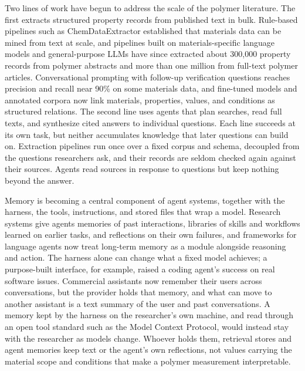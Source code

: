 \documentclass[journal=mamobx,manuscript=article]{achemso}
\begin{document}
Two lines of work have begun to address the scale of the polymer literature.
The first extracts structured property records from published text in bulk.
Rule-based pipelines such as ChemDataExtractor established that materials data can be mined from text at scale,\cite{Swain2016ChemDataExtractor} and pipelines built on materials-specific language models and general-purpose LLMs have since extracted about 300,000 property records from polymer abstracts\cite{Shetty2023Pipeline} and more than one million from full-text polymer articles.\cite{Gupta2024LLM}
Conversational prompting with follow-up verification questions reaches precision and recall near 90\% on some materials data,\cite{Polak2024Extracting} and fine-tuned models and annotated corpora now link materials, properties, values, and conditions as structured relations.\cite{Dagdelen2024Structured,Cheung2024POLYIE}
The second line uses agents that plan searches, read full texts, and synthesize cited answers to individual questions.\cite{Lala2023PaperQA,Skarlinski2024PaperQA2}
Each line succeeds at its own task, but neither accumulates knowledge that later questions can build on.
Extraction pipelines run once over a fixed corpus and schema, decoupled from the questions researchers ask, and their records are seldom checked again against their sources.
Agents read sources in response to questions but keep nothing beyond the answer.

Memory is becoming a central component of agent systems, together with the harness, the tools, instructions, and stored files that wrap a model.
Research systems give agents memories of past interactions,\cite{Packer2023MemGPT,Park2023Generative} libraries of skills and workflows learned on earlier tasks,\cite{Wang2023Voyager,Wang2024Workflow} and reflections on their own failures,\cite{Shinn2023Reflexion} and frameworks for language agents now treat long-term memory as a module alongside reasoning and action.\cite{Sumers2024CoALA,Zhang2024Memory}
The harness alone can change what a fixed model achieves; a purpose-built interface, for example, raised a coding agent's success on real software issues.\cite{Yang2024SWEagent}
Commercial assistants now remember their users across conversations,\cite{OpenAI2024Memory,Anthropic2025Memory} but the provider holds that memory, and what can move to another assistant is a text summary of the user and past conversations.
A memory kept by the harness on the researcher's own machine, and read through an open tool standard such as the Model Context Protocol,\cite{Anthropic2024MCP} would instead stay with the researcher as models change.
Whoever holds them, retrieval stores and agent memories keep text or the agent's own reflections,\cite{Lewis2020RAG} not values carrying the material scope and conditions that make a polymer measurement interpretable.
\end{document}
